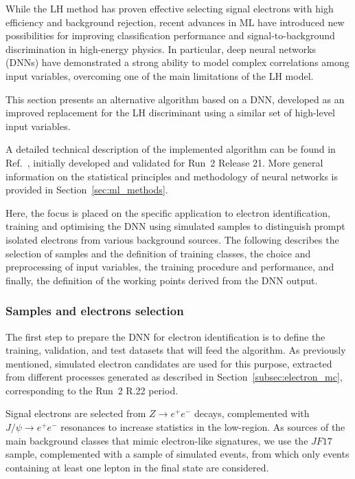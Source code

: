While the LH method has proven effective selecting signal electrons with high efficiency and background rejection, recent advances in ML have introduced new possibilities for improving classification performance and signal-to-background discrimination in high-energy physics. In particular, deep neural networks (DNNs) have demonstrated a strong ability to model complex correlations among input variables, overcoming one of the main limitations of the LH model.

This section presents an alternative algorithm based on a DNN, developed as an improved replacement for the LH discriminant using a similar set of high-level input variables.

A detailed technical description of the implemented algorithm can be found in Ref.~\cite{dnn_paper}, initially developed and validated for Run~2 Release 21. More general information on the statistical principles and methodology of neural networks is provided in Section~\ref{sec:ml_methods}.

Here, the focus is placed on the specific application to electron identification, training and optimising the DNN using simulated samples to distinguish prompt isolated electrons from various background sources. The following describes the selection of samples and the definition of training classes, the choice and preprocessing of input variables, the training procedure and performance, and finally, the definition of the working points derived from the DNN output.

\subsubsection{Samples and electrons selection}
The first step to prepare the DNN for electron identification is to define the training, validation, and test datasets that will feed the algorithm. As previously mentioned, simulated electron candidates are used for this purpose, extracted from different processes generated as described in Section~\ref{subsec:electron_mc}, corresponding to the Run~2 R.22 period.

Signal electrons are selected from $Z \rightarrow e^{+}e^{-}$ decays, complemented with $J/\psi \rightarrow e^{+}e^{-}$ resonances to increase statistics in the low-\pt region. As sources of the main background classes that mimic electron-like signatures, we use the $JF17$ sample, complemented with a sample of simulated \ttbar events, from which only events containing at least one lepton in the final state are considered.

